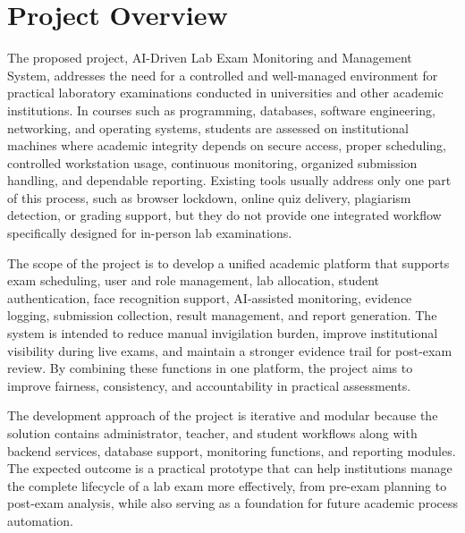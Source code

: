 \newpage
\thispagestyle{empty}
\chapter*{\centering Project Overview}
The proposed project, AI-Driven Lab Exam Monitoring and Management System, addresses the need for a controlled and well-managed environment for practical laboratory examinations conducted in universities and other academic institutions. In courses such as programming, databases, software engineering, networking, and operating systems, students are assessed on institutional machines where academic integrity depends on secure access, proper scheduling, controlled workstation usage, continuous monitoring, organized submission handling, and dependable reporting. Existing tools usually address only one part of this process, such as browser lockdown, online quiz delivery, plagiarism detection, or grading support, but they do not provide one integrated workflow specifically designed for in-person lab examinations.

The scope of the project is to develop a unified academic platform that supports exam scheduling, user and role management, lab allocation, student authentication, face recognition support, AI-assisted monitoring, evidence logging, submission collection, result management, and report generation. The system is intended to reduce manual invigilation burden, improve institutional visibility during live exams, and maintain a stronger evidence trail for post-exam review. By combining these functions in one platform, the project aims to improve fairness, consistency, and accountability in practical assessments.

The development approach of the project is iterative and modular because the solution contains administrator, teacher, and student workflows along with backend services, database support, monitoring functions, and reporting modules. The expected outcome is a practical prototype that can help institutions manage the complete lifecycle of a lab exam more effectively, from pre-exam planning to post-exam analysis, while also serving as a foundation for future academic process automation.

